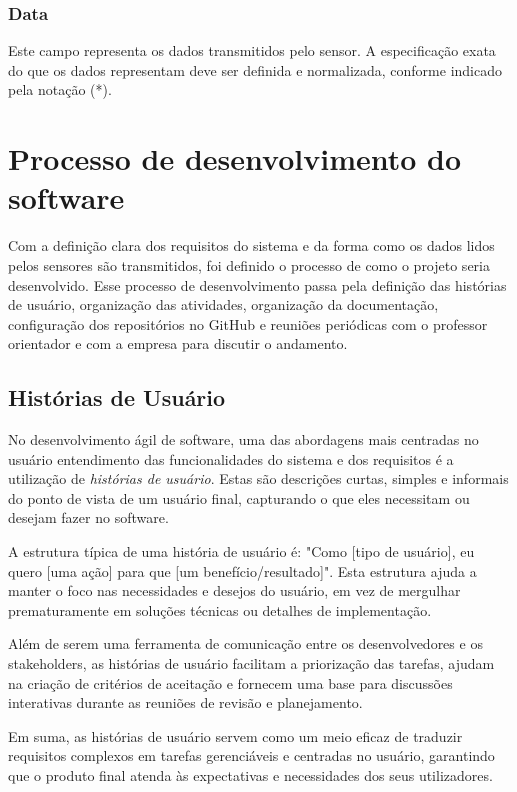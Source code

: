 \subsubsection{Data}

Este campo representa os dados transmitidos pelo sensor. A especificação exata do que os dados representam deve ser definida e normalizada, conforme indicado pela notação (*).


\section[Processo de desenvolvimento do software]{Processo de desenvolvimento do software}
Com a definição clara dos requisitos do sistema e da forma como os dados lidos pelos sensores são transmitidos, foi definido o processo de como o projeto seria desenvolvido. Esse processo de desenvolvimento passa pela definição das histórias de usuário, organização das atividades, organização da documentação, configuração dos repositórios no GitHub e reuniões periódicas com o professor orientador e com a empresa para discutir o andamento.

\subsection{Histórias de Usuário}
No desenvolvimento ágil de software, uma das abordagens mais centradas no usuário entendimento das funcionalidades do sistema e dos requisitos é a utilização de \textit{histórias de usuário}. Estas são descrições curtas, simples e informais do ponto de vista de um usuário final, capturando o que eles necessitam ou desejam fazer no software.

A estrutura típica de uma história de usuário é: "Como [tipo de usuário], eu quero [uma ação] para que [um benefício/resultado]". Esta estrutura ajuda a manter o foco nas necessidades e desejos do usuário, em vez de mergulhar prematuramente em soluções técnicas ou detalhes de implementação.

Além de serem uma ferramenta de comunicação entre os desenvolvedores e os stakeholders, as histórias de usuário facilitam a priorização das tarefas, ajudam na criação de critérios de aceitação e fornecem uma base para discussões interativas durante as reuniões de revisão e planejamento.

Em suma, as histórias de usuário servem como um meio eficaz de traduzir requisitos complexos em tarefas gerenciáveis e centradas no usuário, garantindo que o produto final atenda às expectativas e necessidades dos seus utilizadores.

